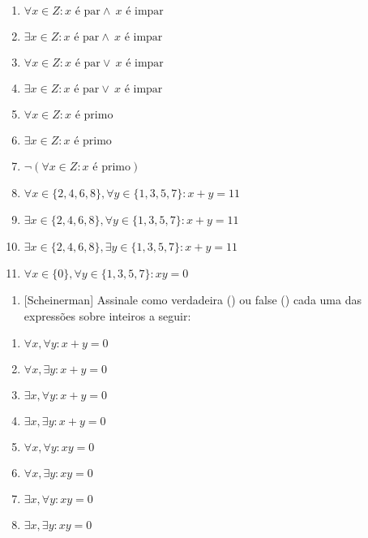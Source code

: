 \begin{enumerate}
\def\labelenumi{\alph{enumi}.}
\item
  \(\forall x \in Z : x \text{ é par} \land\ x \text{ é impar}\)
\item
  \(\exists x \in Z : x \text{ é par} \land\ x \text{ é impar}\)
\item
  \(\forall x \in Z : x \text{ é par} \lor\ x \text{ é impar}\)
\item
  \(\exists x \in Z : x \text{ é par} \lor\ x \text{ é impar}\)
\item
  \(\forall x \in Z : x \text{ é primo}\)
\item
  \(\exists x \in Z : x \text{ é primo}\)
\item
  \(\neg(\forall x \in Z : x \text{ é primo} )\)
\item
  \(\forall x \in \{2,4,6,8\}, \forall y \in \{1,3,5,7\} : x + y = 11\)
\item
  \(\exists x \in \{2,4,6,8\}, \forall y \in \{1,3,5,7\} : x + y = 11\)
\item
  \(\exists x \in \{2,4,6,8\}, \exists y \in \{1,3,5,7\} : x + y = 11\)
\item
  \(\forall x \in \{0\}, \forall y \in \{1,3,5,7\} : xy = 0\)
\end{enumerate}

\begin{enumerate}
\def\labelenumi{\arabic{enumi}.}
\setcounter{enumi}{2}
\item
  {[}Scheinerman{]} Assinale como verdadeira (\T) ou false (\F) cada uma
  das expressões sobre inteiros a seguir:
\end{enumerate}

\begin{enumerate}
\def\labelenumi{\alph{enumi}.}
\item
  \(\forall x, \forall y : x + y = 0\)
\item
  \(\forall x, \exists y : x + y = 0\)
\item
  \(\exists x, \forall y : x + y = 0\)
\item
  \(\exists x, \exists y : x + y = 0\)
\item
  \(\forall x, \forall y : xy = 0\)
\item
  \(\forall x, \exists y : xy = 0\)
\item
  \(\exists x, \forall y : xy = 0\)
\item
  \(\exists x, \exists y : xy = 0\)
\end{enumerate}
